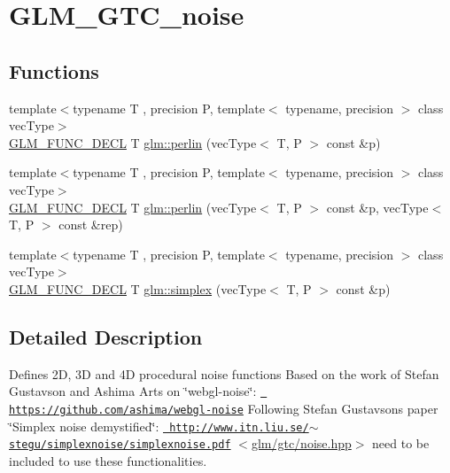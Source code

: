 \hypertarget{group__gtc__noise}{}\section{G\+L\+M\+\_\+\+G\+T\+C\+\_\+noise}
\label{group__gtc__noise}
\subsection*{Functions}
\begin{DoxyCompactItemize}
\item 
{\footnotesize template$<$typename T , precision P, template$<$ typename, precision $>$ class vec\+Type$>$ }\\\mbox{\hyperlink{setup_8hpp_ab2d052de21a70539923e9bcbf6e83a51}{G\+L\+M\+\_\+\+F\+U\+N\+C\+\_\+\+D\+E\+CL}} T \mbox{\hyperlink{group__gtc__noise_ga14e5975486b2b36e747861d3c65b16c1}{glm\+::perlin}} (vec\+Type$<$ T, P $>$ const \&p)
\item 
{\footnotesize template$<$typename T , precision P, template$<$ typename, precision $>$ class vec\+Type$>$ }\\\mbox{\hyperlink{setup_8hpp_ab2d052de21a70539923e9bcbf6e83a51}{G\+L\+M\+\_\+\+F\+U\+N\+C\+\_\+\+D\+E\+CL}} T \mbox{\hyperlink{group__gtc__noise_ga7e103ffffacb322fe2d4863c372ae2fd}{glm\+::perlin}} (vec\+Type$<$ T, P $>$ const \&p, vec\+Type$<$ T, P $>$ const \&rep)
\item 
{\footnotesize template$<$typename T , precision P, template$<$ typename, precision $>$ class vec\+Type$>$ }\\\mbox{\hyperlink{setup_8hpp_ab2d052de21a70539923e9bcbf6e83a51}{G\+L\+M\+\_\+\+F\+U\+N\+C\+\_\+\+D\+E\+CL}} T \mbox{\hyperlink{group__gtc__noise_ga05f5ab240c9a3fdeee353636e464c285}{glm\+::simplex}} (vec\+Type$<$ T, P $>$ const \&p)
\end{DoxyCompactItemize}


\subsection{Detailed Description}
Defines 2D, 3D and 4D procedural noise functions Based on the work of Stefan Gustavson and Ashima Arts on \char`\"{}webgl-\/noise\char`\"{}\+: \href{https://github.com/ashima/webgl-noise}{\texttt{ https\+://github.\+com/ashima/webgl-\/noise}} Following Stefan Gustavson\textquotesingle{}s paper \char`\"{}\+Simplex noise demystified\char`\"{}\+: \href{http://www.itn.liu.se/~stegu/simplexnoise/simplexnoise.pdf}{\texttt{ http\+://www.\+itn.\+liu.\+se/$\sim$stegu/simplexnoise/simplexnoise.\+pdf}} $<$\mbox{\hyperlink{noise_8hpp}{glm/gtc/noise.\+hpp}}$>$ need to be included to use these functionalities. 

